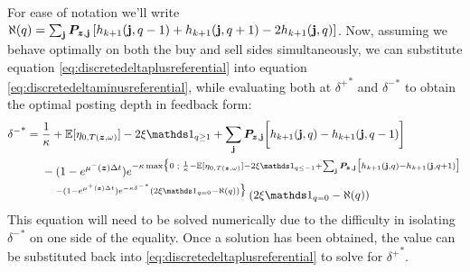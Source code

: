 For ease of notation we'll write $\aleph(q) = \sum_{\mathbf{j}} \bm{P}_{\bm{z},\mathbf{j}} \left[ h_{k+1}(\mathbf{j}, q-1) + h_{k+1}(\mathbf{j}, q+1) -2 h_{k+1}(\mathbf{j}, q)  \right]$. Now, assuming we behave optimally on both the buy and sell sides simultaneously, we can substitute equation \ref{eq:discretedeltaplusreferential} into equation \ref{eq:discretedeltaminusreferential}, while evaluating both at ${\delta^+}^*$ and ${\delta^-}^*$ to obtain the optimal posting depth in feedback form:
\begin{equation}\label{eq:discretedeltaminusfeedback}
\begin{split}
{\delta^-}^* & = \frac{1}{\kappa} + \E[\eta_{0,T(\bz, \omega)}] - 2 \xi \indicator_{q \geq 1} + \sum_\bj \bP_{\bz,\bj} \biggl[ h_{k+1}(\bj, q) - h_{k+1}(\bj, q-1) \biggr] \\
& \hphantom{{}={}} - (1-e^{\mu^-(\bz) \Delta t})e^{-\kappa \max \bigl\lbrace 0 \; ; \; \frac{1}{\kappa} - \E[\eta_{0,T(\bz, \omega)}] - 2 \xi \indicator_{q \leq -1} + \sum_\bj \bP_{\bz,\bj} \bigl[ h_{k+1}(\bj, q) - h_{k+1}(\bj, q+1) \bigr]} \\
& \hphantom{{}={} {}-{}} {}^{-(1-e^{\mu^+ (\bz) \Delta t})e^{-\kappa {\delta^-}^*} \left( 2 \xi \indicator_{q = 0} - \aleph(q) \right) \bigr\rbrace } \left( 2 \xi \indicator_{q = 0} - \aleph(q) \right)
\end{split}
\end{equation}
This equation will need to be solved numerically due to the difficulty in isolating ${\delta^{-}}^*$ on one side of the equality. Once a solution has been obtained, the value can be substituted back into \eqref{eq:discretedeltaplusreferential} to solve for ${\delta^{+}}^*$.

